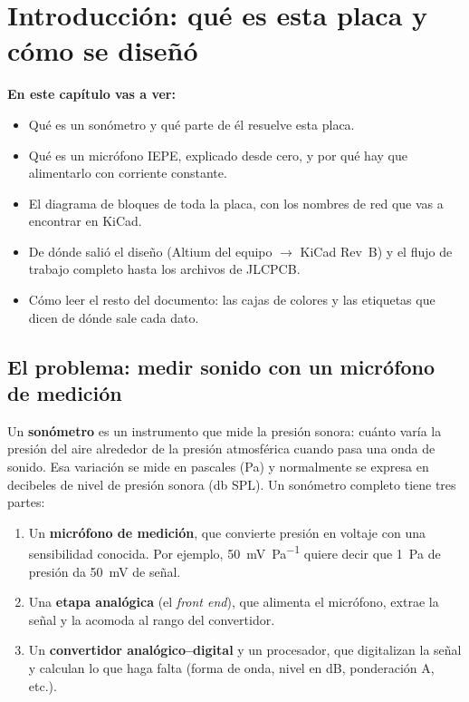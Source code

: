 \chapter[Introducción]{Introducción: qué es esta placa y cómo se diseñó}\label{cap:intro}

\textbf{En este capítulo vas a ver:}
\begin{itemize}
  \item Qué es un sonómetro y qué parte de él resuelve esta placa.
  \item Qué es un micrófono IEPE, explicado desde cero, y por qué hay que alimentarlo con corriente constante.
  \item El diagrama de bloques de toda la placa, con los nombres de red que vas a encontrar en KiCad.
  \item De dónde salió el diseño (Altium del equipo $\rightarrow$ KiCad Rev~B) y el flujo de trabajo completo hasta los archivos de JLCPCB.
  \item Cómo leer el resto del documento: las cajas de colores y las etiquetas que dicen de dónde sale cada dato.
\end{itemize}

\section{El problema: medir sonido con un micrófono de medición}

Un \textbf{sonómetro} es un instrumento que mide la presión sonora: cuánto varía la presión del aire alrededor de la presión atmosférica cuando pasa una onda de sonido. Esa variación se mide en pascales (\si{\pascal}) y normalmente se expresa en decibeles de nivel de presión sonora (\si{\decibel} SPL). Un sonómetro completo tiene tres partes:
\begin{enumerate}
  \item Un \textbf{micrófono de medición}, que convierte presión en voltaje con una sensibilidad conocida. Por ejemplo, \SI{50}{\milli\volt\per\pascal} quiere decir que \SI{1}{\pascal} de presión da \SI{50}{\milli\volt} de señal.
  \item Una \textbf{etapa analógica} (el \emph{front end}), que alimenta el micrófono, extrae la señal y la acomoda al rango del convertidor.
  \item Un \textbf{convertidor analógico--digital} y un procesador, que digitalizan la señal y calculan lo que haga falta (forma de onda, nivel en dB, ponderación A, etc.).
\end{enumerate}

